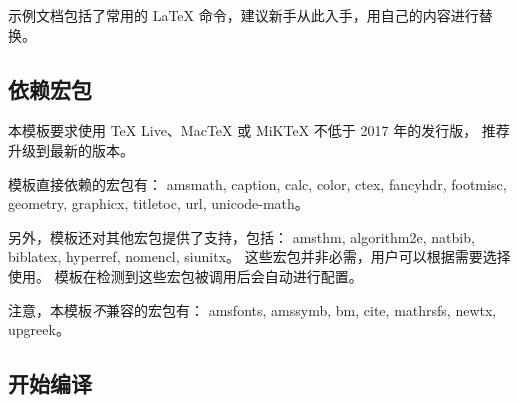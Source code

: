 \documentclass[a4paper]{ltxdoc}
\DeclareRobustCommand\pkg{\textsf}
\begin{document}
示例文档包括了常用的 \LaTeX{} 命令，建议新手从此入手，用自己的内容进行替换。


\subsection{依赖宏包}

本模板要求使用 TeX Live、MacTeX 或 MiKTeX 不低于 2017 年的发行版，
推荐升级到最新的版本。

模板直接依赖的宏包有：
\pkg{amsmath},
\pkg{caption},
\pkg{calc},
\pkg{color},
\pkg{ctex},
\pkg{fancyhdr},
\pkg{footmisc},
\pkg{geometry},
\pkg{graphicx},
\pkg{titletoc},
\pkg{url},
\pkg{unicode-math}。

另外，模板还对其他宏包提供了支持，包括：
\pkg{amsthm},
\pkg{algorithm2e},
\pkg{natbib},
\pkg{biblatex},
\pkg{hyperref},
\pkg{nomencl},
\pkg{siunitx}。
这些宏包并非必需，用户可以根据需要选择使用。
模板在检测到这些宏包被调用后会自动进行配置。

注意，本模板\emph{不}兼容的宏包有：
\pkg{amsfonts},
\pkg{amssymb},
\pkg{bm},
\pkg{cite},
\pkg{mathrsfs},
\pkg{newtx},
\pkg{upgreek}。


\subsection{开始编译}
\end{document}
